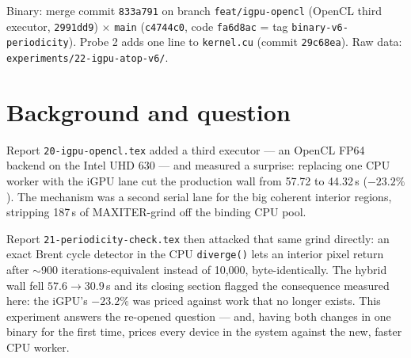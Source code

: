 \documentclass[
	english,
	letterpaper, oneside
]{article}
\begin{document}
\templatePagecfg
\templateFinalcfg

\inserttitle

\begin{center}\small\textsf{%
Binary: merge commit \texttt{833a791} on branch \texttt{feat/igpu-opencl}
(OpenCL third executor, \texttt{2991dd9}) $\times$ \texttt{main}
(\texttt{c4744c0}, code \texttt{fa6d8ac} = tag \texttt{binary-v6-periodicity}).
Probe 2 adds one line to \texttt{kernel.cu} (commit \texttt{29c68ea}).
Raw data: \texttt{experiments/22-igpu-atop-v6/}.%
}\end{center}

\begin{abstract}
We re-measure the integrated-GPU backend of \texttt{20-igpu-opencl.tex} on a
binary that also carries the periodicity check of
\texttt{21-periodicity-check.tex}. Method: the same production A/B
(100 frames, $1920\times1080$, \texttt{diffT}\,=\,0.1, save=1, three
alternated reps), \texttt{dGPU+iGPU+10CPU} vs \texttt{dGPU+11CPU}.
The iGPU's $-23.2\%$ collapses to a wash: $28.05\pm0.12$\,s vs
$27.36\pm1.60$\,s ($+2.5\%$ on all-reps means, $-0.7\%$ excluding a cold
first run). The mechanism is an exact cancellation: the iGPU strips
27\,CPU-seconds off the binding CPU pool, and the CPU worker it displaces
would have contributed 26.5. Expressed as marginal value, periodicity
re-priced the dGPU from $\sim$23 to 2.7 CPU-worker equivalents and the iGPU
from $\sim$13 to $\approx$1. Two follow-up probes kill the obvious rescue:
13-thread oversubscription loses $+7.4\%$ (the lanes busy-spin), and with
\texttt{cudaDeviceScheduleBlockingSync} the recovered worker lands past the
SMT knee --- a wash that also closes the report-15 confirmation item.
Recommendation: keep \texttt{feat/igpu-opencl} off \texttt{main}.
\end{abstract}

\section{Background and question}

Report \texttt{20-igpu-opencl.tex} added a third executor --- an OpenCL FP64
backend on the Intel UHD 630 --- and measured a surprise: replacing one CPU
worker with the iGPU lane cut the production wall from 57.72 to 44.32\,s
($-23.2\%$). The mechanism was a second serial lane for the big
coherent interior regions, stripping 187\,s of MAXITER-grind off the binding
CPU pool.

Report \texttt{21-periodicity-check.tex} then attacked that same grind
directly: an exact Brent cycle detector in the CPU \texttt{diverge()} lets an
interior pixel return after $\sim$900 iterations-equivalent instead of
10{,}000, byte-identically. The hybrid wall fell $57.6\to30.9$\,s and its
closing section flagged the consequence measured here: the iGPU's
$-23.2\%$ was priced against work that no longer exists. This experiment
answers the re-opened question --- and, having both changes in one binary for
the first time, prices every device in the system against the new, faster
CPU worker.
\end{document}
